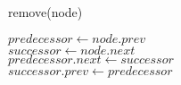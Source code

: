 \documentclass{article}
\begin{document}
\begin{algorithm}
\caption{remove(node)}
$predecessor\gets node.prev$ \\
$successor\gets node.next$ \\
$predecessor.next\gets successor$ \\
$successor.prev\gets predecessor$
\end{algorithm}
\end{document}
